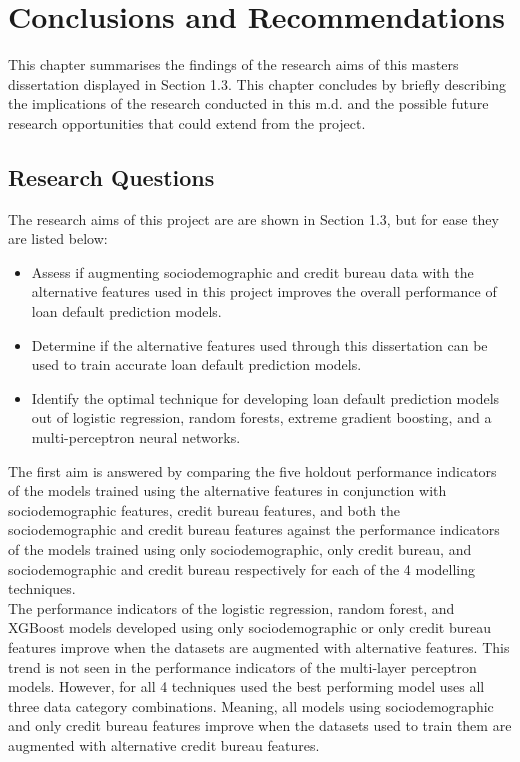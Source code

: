 \chapter{Conclusions and Recommendations} 
\label{Chapter6}

This chapter summarises the findings of the research aims of this masters dissertation displayed in Section 1.3. This chapter concludes by briefly describing the implications of the research conducted in this m.d. and the possible future research opportunities that could extend from the project.\\

\section{Research Questions}

The research aims of this project are are shown in Section 1.3, but for ease they are listed below:

\begin{itemize}
    \item Assess if augmenting sociodemographic and credit bureau data with the alternative features used in this project improves the overall performance of loan default prediction models.
    \item Determine if the alternative features used through this dissertation can be used to train accurate loan default prediction models. 
    \item Identify the optimal technique for developing loan default prediction models out of logistic regression, random forests, extreme gradient boosting, and a multi-perceptron neural networks. 
\end{itemize}

\vspace{10pt}

The first aim is answered by comparing the five holdout performance indicators of the models trained using the alternative features in conjunction with sociodemographic features, credit bureau features, and both the sociodemographic and credit bureau features against the performance indicators of the models trained using only sociodemographic, only credit bureau, and sociodemographic and credit bureau respectively for each of the 4 modelling techniques. \\

The performance indicators of the logistic regression, random forest, and XGBoost models developed using only sociodemographic or only credit bureau features improve when the datasets are augmented with alternative features. This trend is not seen in the performance indicators of the multi-layer perceptron models. However, for all 4 techniques used the best performing model uses all three data category combinations. Meaning, all models using sociodemographic and only credit bureau features improve when the datasets used to train them are augmented with alternative credit bureau features. \\

